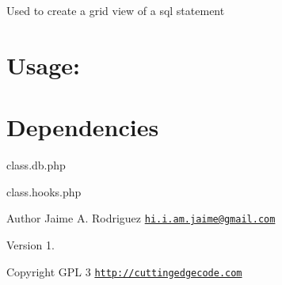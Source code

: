Used to create a grid view of a sql statement\hypertarget{robo1_usage}{}\section{Usage\-:}\label{robo1_usage}

\hypertarget{ip2country_dependencies}{}\section{Dependencies}\label{ip2country_dependencies}

\begin{DoxyItemize}
\item class.\-db.\-php
\item class.\-hooks.\-php
\end{DoxyItemize}

\begin{DoxyAuthor}{Author}
Jaime A. Rodriguez \href{mailto:hi.i.am.jaime@gmail.com}{\tt hi.\-i.\-am.\-jaime@gmail.\-com} 
\end{DoxyAuthor}
\begin{DoxyVersion}{Version}
1. 
\end{DoxyVersion}
\begin{DoxyCopyright}{Copyright}
G\-P\-L 3 \href{http://cuttingedgecode.com}{\tt http\-://cuttingedgecode.\-com} 
\end{DoxyCopyright}
